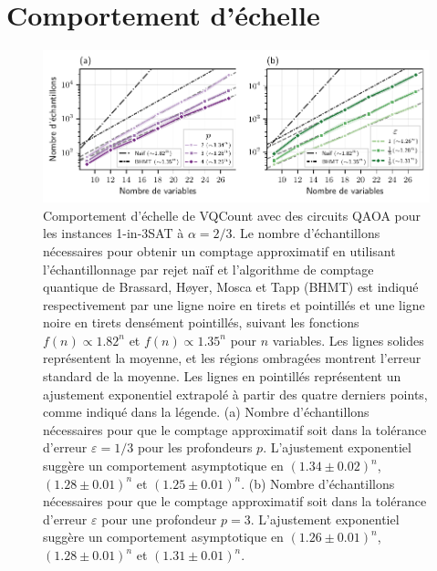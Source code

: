 \section{Comportement d'échelle}
\label{sec:comportement-echelle}

\begin{figure}[ht!]
    \centering
    \includegraphics[width=1\textwidth]{figures/1in3sat-number-of-samples.pdf}
    \caption[Comportement d'échelle du nombre d'échantillons pour \#1-in-3SAT]{Comportement d'échelle de VQCount avec des circuits QAOA pour les instances 1-in-3SAT à $\alpha=2/3$. Le nombre d'échantillons nécessaires pour obtenir un comptage approximatif en utilisant l'échantillonnage par rejet naïf et l'algorithme de comptage quantique de Brassard, Høyer, Mosca et Tapp (BHMT) est indiqué respectivement par une ligne noire en tirets et pointillés et une ligne noire en tirets densément pointillés, suivant les fonctions $f(n) \propto 1.82^{n}$ et $f(n) \propto 1.35^{n}$ pour $n$ variables. Les lignes solides représentent la moyenne, et les régions ombragées montrent l'erreur standard de la moyenne. Les lignes en pointillés représentent un ajustement exponentiel extrapolé à partir des quatre derniers points, comme indiqué dans la légende. (a) Nombre d'échantillons nécessaires pour que le comptage approximatif soit dans la tolérance d'erreur $\varepsilon = 1/3$ pour les profondeurs $p$. L'ajustement exponentiel suggère un comportement asymptotique en $(1.34 \pm 0.02)^{n}$, $(1.28 \pm 0.01)^{n}$ et $(1.25 \pm 0.01)^{n}$. (b) Nombre d'échantillons nécessaires pour que le comptage approximatif soit dans la tolérance d'erreur $\varepsilon$ pour une profondeur $p=3$. L'ajustement exponentiel suggère un comportement asymptotique en $(1.26 \pm 0.01)^{n}$, $(1.28 \pm 0.01)^{n}$ et $(1.31 \pm 0.01)^{n}$.}
    \label{fig:1in3sat-number-of-samples}
\end{figure}

